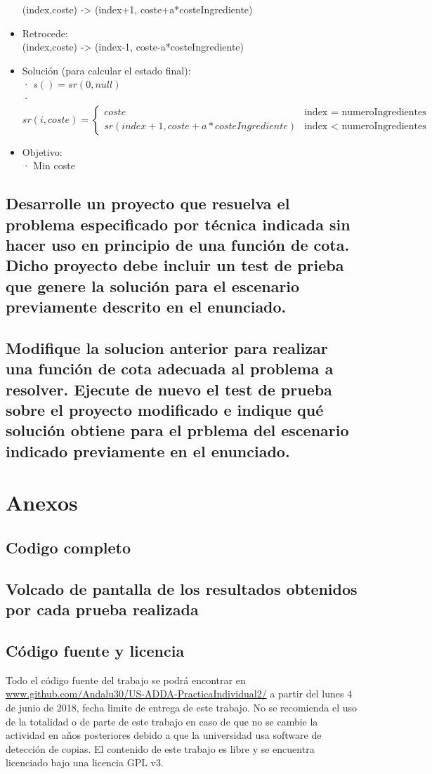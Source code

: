 \documentclass[a4paper,12pt]{article}
\begin{document}
\begin{itemize}
      (index,coste) -> (index+1, coste+a*costeIngrediente)
\item Retrocede:\\
      (index,coste) -> (index-1, coste-a*costeIngrediente)
\item Solución (para calcular el estado final):\\
      · $s() = sr(0,null)$\\
      · $sr(i, coste) =
      \begin{cases}
      coste  &\mbox{index = numeroIngredientes}\\
      sr(index+1, coste+a*costeIngrediente) &\mbox{index < numeroIngredientes}
      \end{cases}$

\item Objetivo:\\
      · Min coste


\end{itemize}


\subsection{Desarrolle un proyecto que resuelva el problema especificado por técnica indicada sin hacer uso en principio de una función de cota. Dicho proyecto debe incluir un test de prieba que genere la solución para el escenario previamente descrito en el enunciado.}
\subsection{Modifique la solucion anterior para realizar una función de cota adecuada al problema a resolver. Ejecute de nuevo el test de prueba sobre el proyecto modificado e indique qué solución obtiene para el prblema del escenario indicado previamente en el enunciado.}


\section{Anexos}
\subsection{Codigo completo}
\subsection{Volcado de pantalla de los resultados obtenidos por cada prueba realizada}
\subsection{Código fuente y licencia}
Todo el código fuente del trabajo se podrá encontrar en \url{www.github.com/Andalu30/US-ADDA-PracticaIndividual2/}
a partir del lunes 4 de junio de 2018, fecha limite de entrega de este trabajo.
No se recomienda el uso de la totalidad o de parte de este trabajo en caso de que no se cambie la actividad en años posteriores debido a que la universidad usa software de detección de copias.
El contenido de este trabajo es libre y se encuentra licenciado bajo una licencia GPL v3.\\
\end{document}
